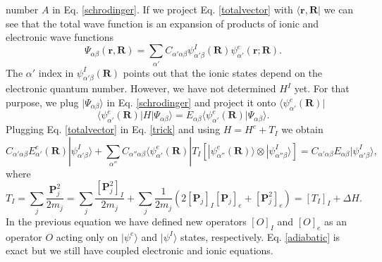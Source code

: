 number $A$ in Eq. \ref{schrodinger}. If we project Eq. \ref{totalvector} with $\langle\mathbf{r},\mathbf{R}|$ we can see that the total wave function is an expansion of products of ionic and electronic wave functions
\begin{equation}
 \Psi_{\alpha\beta}(\mathbf{r},\mathbf{R})=\sum_{\alpha'}C_{\alpha'\alpha\beta}\psi_{\alpha'\beta}^{I}(\mathbf{R})\psi_{\alpha'}^{e}(\mathbf{r};\mathbf{R}).
\end{equation}
The $\alpha'$ index in $\psi_{\alpha'\beta}^{I}(\mathbf{R})$ points out that the ionic states depend on the electronic quantum number. However, we have not determined $H^{I}$ yet. For that purpose, we plug 
$|\Psi_{\alpha\beta}\rangle$ in Eq. \ref{schrodinger} and project it onto $\langle\psi_{\alpha'}^{e}(\mathbf{R})|$
\begin{equation}
\label{trick}
 \langle\psi_{\alpha'}^{e}(\mathbf{R})|H|\Psi_{\alpha\beta}\rangle=E_{\alpha\beta}\langle\psi_{\alpha'}^{e}(\mathbf{R})|\Psi_{\alpha\beta}\rangle.
\end{equation}
Plugging Eq. \ref{totalvector} in Eq. \ref{trick} and using $H=H^{e}+T_{I}$ we obtain
\begin{equation}
\label{adiabatic}
 C_{\alpha'\alpha\beta}E_{\alpha'}^{e}(\mathbf{R})|\psi_{\alpha'\beta}^{I}\rangle+\sum_{\alpha''}C_{\alpha''\alpha\beta}\langle\psi_{\alpha'}^{e}(\mathbf{R})|T_{I}[|\psi_{\alpha''}^{e}(\mathbf{R})\rangle\otimes|\psi_{\alpha''\beta}^{
 I}\rangle]=C_{\alpha'\alpha\beta}E_{\alpha\beta}|\psi_{\alpha'\beta}^{I}\rangle,
\end{equation}
where
\begin{equation}
 T_{I}=\sum_{j}\frac{\mathbf{P}_{j}^{2}}{2m_{j}}=\sum_{j}\frac{[\mathbf{P}_{j}^{2}]_{I}}{2m_{j}}+\sum_{j}\frac{1}{2m_{j}}(2[\mathbf{P}_{j}]_{I}[\mathbf{P}_{j}]_{e}+[\mathbf{P}_{j}^{2}]_{e})=[T_{I}]_{I}+\Delta H.
\end{equation}
In the previous equation we have defined new operators $[O]_{I}$ and $[O]_{e}$ as an operator $O$ acting only on $|\psi^{e}\rangle$ and $|\psi^{I}\rangle$ states, respectively. Eq. \ref{adiabatic} is exact but we still 
have coupled electronic and ionic equations. \\

